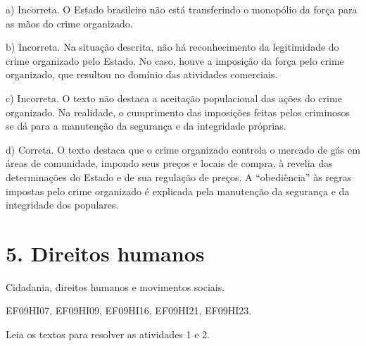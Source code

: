 a) Incorreta. O Estado brasileiro não está transferindo o monopólio da
força para as mãos do crime organizado.

b) Incorreta. Na situação descrita, não há reconhecimento da
legitimidade do crime organizado pelo Estado. No caso, houve a imposição
da força pelo crime organizado, que resultou no domínio das atividades
comerciais.

c) Incorreta. O texto não destaca a aceitação populacional das ações do
crime organizado. Na realidade, o cumprimento das imposições feitas
pelos criminosos se dá para a manutenção da segurança e da integridade
próprias.

d) Correta. O texto destaca que o crime organizado controla o mercado de
gás em áreas de comunidade, impondo seus preços e locais de compra, à
revelia das determinações do Estado e de sua regulação de preços. A
``obediência'' às regras impostas pelo crime organizado é explicada pela
manutenção da segurança e da integridade dos populares.

\chapter{5. Direitos humanos}

 Cidadania, direitos humanos e
movimentos sociais.

 EF09HI07, EF09HI09, EF09HI16, EF09HI21,
EF09HI23.


Leia os textos para resolver as atividades 1 e 2.

